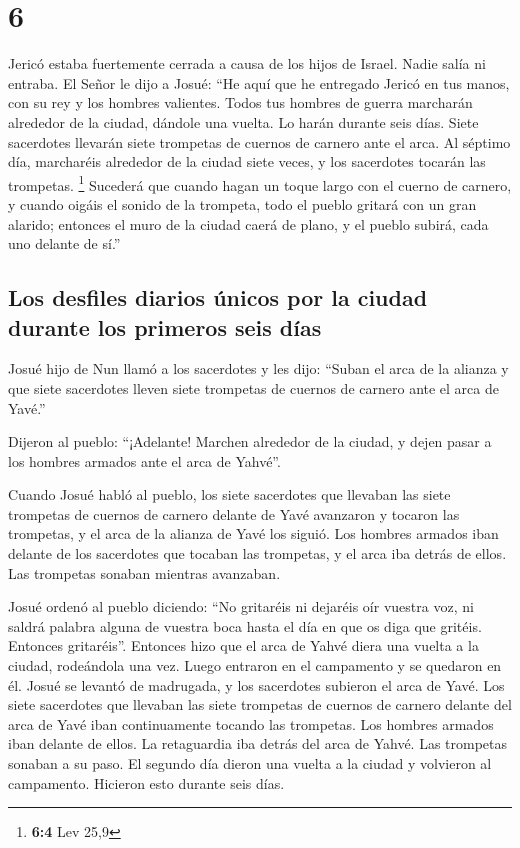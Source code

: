 \hypertarget{section-5}{%
\section{6}\label{section-5}}

 Jericó estaba fuertemente cerrada a causa de los hijos de
Israel. Nadie salía ni entraba.  El Señor le dijo a Josué:
``He aquí que he entregado Jericó en tus manos, con su rey y los hombres
valientes.  Todos tus hombres de guerra marcharán
alrededor de la ciudad, dándole una vuelta. Lo harán durante seis días.
 Siete sacerdotes llevarán siete trompetas de cuernos de
carnero ante el arca. Al séptimo día, marcharéis alrededor de la ciudad
siete veces, y los sacerdotes tocarán las trompetas. \footnote{\textbf{6:4}
  Lev 25,9}  Sucederá que cuando hagan un toque largo con
el cuerno de carnero, y cuando oigáis el sonido de la trompeta, todo el
pueblo gritará con un gran alarido; entonces el muro de la ciudad caerá
de plano, y el pueblo subirá, cada uno delante de sí.''

\hypertarget{los-desfiles-diarios-uxfanicos-por-la-ciudad-durante-los-primeros-seis-duxedas}{%
\subsection{Los desfiles diarios únicos por la ciudad durante los
primeros seis
días}\label{los-desfiles-diarios-uxfanicos-por-la-ciudad-durante-los-primeros-seis-duxedas}}

 Josué hijo de Nun llamó a los sacerdotes y les dijo:
``Suban el arca de la alianza y que siete sacerdotes lleven siete
trompetas de cuernos de carnero ante el arca de Yavé.''

 Dijeron al pueblo: ``¡Adelante! Marchen alrededor de la
ciudad, y dejen pasar a los hombres armados ante el arca de Yahvé''.

 Cuando Josué habló al pueblo, los siete sacerdotes que
llevaban las siete trompetas de cuernos de carnero delante de Yavé
avanzaron y tocaron las trompetas, y el arca de la alianza de Yavé los
siguió.  Los hombres armados iban delante de los
sacerdotes que tocaban las trompetas, y el arca iba detrás de ellos. Las
trompetas sonaban mientras avanzaban.

 Josué ordenó al pueblo diciendo: ``No gritaréis ni
dejaréis oír vuestra voz, ni saldrá palabra alguna de vuestra boca hasta
el día en que os diga que gritéis. Entonces gritaréis''. 
Entonces hizo que el arca de Yahvé diera una vuelta a la ciudad,
rodeándola una vez. Luego entraron en el campamento y se quedaron en él.
 Josué se levantó de madrugada, y los sacerdotes subieron
el arca de Yavé.  Los siete sacerdotes que llevaban las
siete trompetas de cuernos de carnero delante del arca de Yavé iban
continuamente tocando las trompetas. Los hombres armados iban delante de
ellos. La retaguardia iba detrás del arca de Yahvé. Las trompetas
sonaban a su paso.  El segundo día dieron una vuelta a la
ciudad y volvieron al campamento. Hicieron esto durante seis días.

